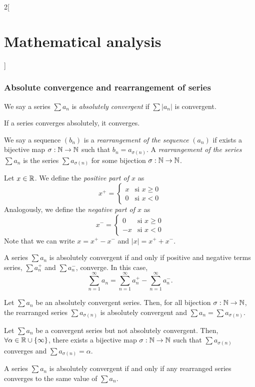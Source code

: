 \documentclass[../../../main.tex]{subfiles}
\begin{document}
\begin{multicols}{2}[\section{Mathematical analysis}]
\subsubsection*{Absolute convergence and rearrangement of series}
\begin{definition}
We say a series $\sum a_n$ is \textit{absolutely convergent} if $\sum |a_n|$ is convergent.
\end{definition}
\begin{theorem}
If a series converges absolutely, it converges.
\end{theorem}
\begin{definition}
We say a sequence $(b_n)$ is a \textit{rearrangement of the sequence} $(a_n)$ if exists a bijective map $\sigma:\mathbb{N} \rightarrow\mathbb{N} $ such that $b_n=a_{\sigma(n)}$. A \textit{rearrangement of the series} $\sum a_n$ is the series $\sum a_{\sigma(n)}$ for some bijection $\sigma:\mathbb{N} \rightarrow\mathbb{N} $.
\end{definition}
\begin{definition}
Let $x\in\mathbb{R} $. We define the \textit{positive part of $x$} as $$x^+=
\begin{cases} 
  x & \text{si }x\geq 0 \\
  0 & \text{si }x<0 
\end{cases}$$ Analogously, we define the \textit{negative part of $x$} as $$x^-=
\begin{cases} 
  0 & \text{si }x\geq 0 \\
  -x & \text{si }x<0 
\end{cases}$$ Note that we can write $x=x^+-x^-$ and $|x|=x^++x^-$.
\end{definition}
\begin{theorem}
A series $\sum a_n$ is absolutely convergent if and only if positive and negative terms series, $\sum a_n^+$ and $\sum a_n^-$, converge. In this case, $$\sum_{n=1}^\infty a_n=\sum_{n=1}^\infty a_n^+-\sum_{n=1}^\infty a_n^-.$$
\end{theorem}
\begin{theorem}
Let $\sum a_n$ be an absolutely convergent series. Then, for all bijection $\sigma:\mathbb{N} \rightarrow\mathbb{N} $, the rearranged series $\sum a_{\sigma(n)}$ is absolutely convergent and $\sum a_n=\sum a_{\sigma(n)}$.
\end{theorem}
\begin{theorem}
Let $\sum a_n$ be a convergent series but not absolutely convergent. Then, $\forall\alpha\in\mathbb{R} \cup\{\infty\}$, there exists a bijective map $\sigma:\mathbb{N} \rightarrow\mathbb{N} $ such that $\sum a_{\sigma(n)}$ converges and $\sum a_{\sigma(n)}=\alpha$.
\end{theorem}
\begin{theorem}
A series $\sum a_n$ is absolutely convergent if and only if any rearranged series converges to the same value of $\sum a_n$.
\end{theorem}

\end{multicols}
\end{document}
